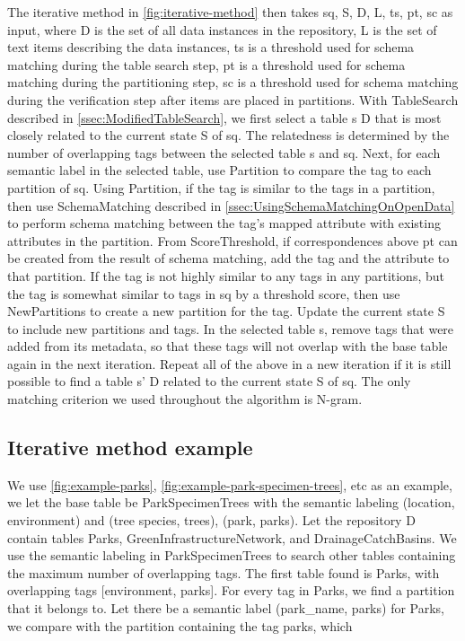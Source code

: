 The iterative method in \autoref{fig:iterative-method} then takes sq, S, D, L, ts, pt, sc as input, where D is the set of all data instances in the repository, L is the set of text items describing the data instances, ts is a threshold used for schema matching during the table search step, pt is a threshold used for schema matching during the partitioning step, sc is a threshold used for schema matching during the verification step after items are placed in partitions.
With TableSearch described in \autoref{ssec:ModifiedTableSearch}, we first select a table s  D that is most closely related to the current state S of sq. The relatedness is determined by the number of overlapping tags between the selected table s and sq. Next, for each semantic label in the selected table, use Partition to compare the tag to each partition of sq. Using Partition, if the tag is similar to the tags in a partition, then use SchemaMatching described in \autoref{ssec:UsingSchemaMatchingOnOpenData} to perform schema matching between the tag's mapped attribute with existing attributes in the partition. From ScoreThreshold, if correspondences above pt can be created from the result of schema matching, add the tag and the attribute to that partition. If the tag is not highly similar to any tags in any partitions, but the tag is somewhat similar to tags in sq by a threshold score, then use NewPartitions to create a new partition for the tag. Update the current state S to include new partitions and tags. In the selected table s, remove tags that were added from its metadata, so that these tags will not overlap with the base table again in the next iteration. Repeat all of the above in a new iteration if it is still possible to find a table s'  D related to the current state S of sq. The only matching criterion we used throughout the algorithm is N-gram.

\subsection{Iterative method example}
\label{ssec:IterativeMethodExample}

We use \autoref{fig:example-parks}, \autoref{fig:example-park-specimen-trees}, etc as an example, we let the base table be ParkSpecimenTrees with the semantic labeling (location, environment) and (tree species, trees), (park, parks). Let the repository D contain tables Parks, GreenInfrastructureNetwork, and DrainageCatchBasins. We use the semantic labeling in ParkSpecimenTrees to search other tables containing the maximum number of overlapping tags. The first table found is Parks, with overlapping tags [environment, parks]. For every tag in Parks, we find a partition that it belongs to. Let there be a semantic label (park\_name, parks) for Parks, we compare with the partition containing the tag parks, which

